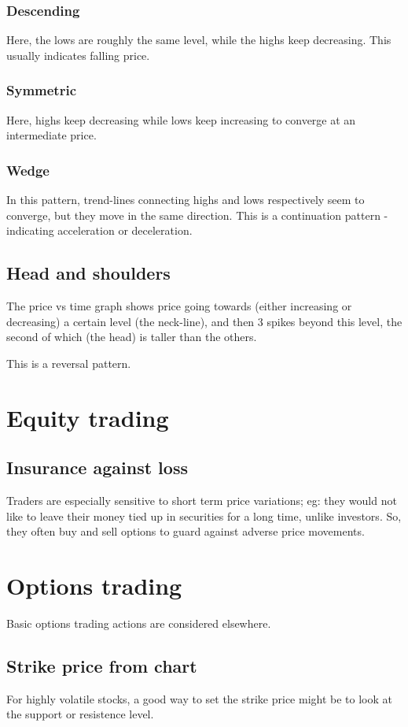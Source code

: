 \documentclass[oneside, article]{memoir}
\begin{document}
\subsubsection{Descending}
Here, the lows are roughly the same level, while the highs keep decreasing. This usually indicates falling price.

\subsubsection{Symmetric}
Here, highs keep decreasing while lows keep increasing to converge at an intermediate price.

\subsubsection{Wedge}
In this pattern, trend-lines connecting highs and lows respectively seem to converge, but they move in the same direction. This is a continuation pattern - indicating acceleration or deceleration.

\subsection{Head and shoulders}
The price vs time graph shows price going towards (either increasing or decreasing) a certain level (the neck-line), and then 3 spikes beyond this level, the second of which (the head) is taller than the others.

This is a reversal pattern.

\section{Equity trading}
\subsection{Insurance against loss}
Traders are especially sensitive to short term price variations; eg: they would not like to leave their money tied up in securities for a long time, unlike investors. So, they often buy and sell options to guard against adverse price movements.

\section{Options trading}
Basic options trading actions are considered elsewhere.

\subsection{Strike price from chart}
For highly volatile stocks, a good way to set the strike price might be to look at the support or resistence level.
\end{document}
